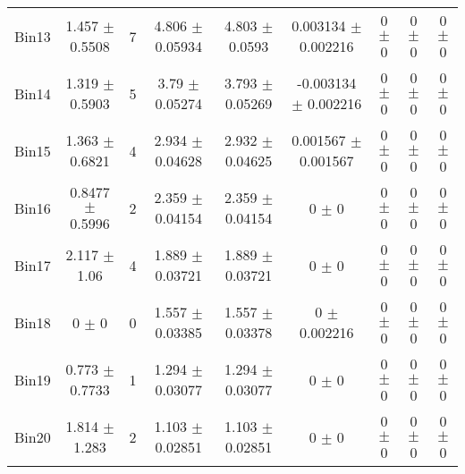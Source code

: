 \begin{tabular}{@{\extracolsep{4pt}}lcccccccc@{}}
     Bin13 & 1.457 $\pm$ 0.5508 & 7 & 4.806 $\pm$ 0.05934 & 4.803 $\pm$ 0.0593 & 0.003134 $\pm$ 0.002216 & 0 $\pm$ 0 & 0 $\pm$ 0 & 0 $\pm$ 0 \\ 
     Bin14 & 1.319 $\pm$ 0.5903 & 5 & 3.79 $\pm$ 0.05274 & 3.793 $\pm$ 0.05269 & -0.003134 $\pm$ 0.002216 & 0 $\pm$ 0 & 0 $\pm$ 0 & 0 $\pm$ 0 \\ 
     Bin15 & 1.363 $\pm$ 0.6821 & 4 & 2.934 $\pm$ 0.04628 & 2.932 $\pm$ 0.04625 & 0.001567 $\pm$ 0.001567 & 0 $\pm$ 0 & 0 $\pm$ 0 & 0 $\pm$ 0 \\ 
     Bin16 & 0.8477 $\pm$ 0.5996 & 2 & 2.359 $\pm$ 0.04154 & 2.359 $\pm$ 0.04154 & 0 $\pm$ 0 & 0 $\pm$ 0 & 0 $\pm$ 0 & 0 $\pm$ 0 \\ 
     Bin17 & 2.117 $\pm$ 1.06 & 4 & 1.889 $\pm$ 0.03721 & 1.889 $\pm$ 0.03721 & 0 $\pm$ 0 & 0 $\pm$ 0 & 0 $\pm$ 0 & 0 $\pm$ 0 \\ 
     Bin18 & 0 $\pm$ 0 & 0 & 1.557 $\pm$ 0.03385 & 1.557 $\pm$ 0.03378 & 0 $\pm$ 0.002216 & 0 $\pm$ 0 & 0 $\pm$ 0 & 0 $\pm$ 0 \\ 
     Bin19 & 0.773 $\pm$ 0.7733 & 1 & 1.294 $\pm$ 0.03077 & 1.294 $\pm$ 0.03077 & 0 $\pm$ 0 & 0 $\pm$ 0 & 0 $\pm$ 0 & 0 $\pm$ 0 \\ 
     Bin20 & 1.814 $\pm$ 1.283 & 2 & 1.103 $\pm$ 0.02851 & 1.103 $\pm$ 0.02851 & 0 $\pm$ 0 & 0 $\pm$ 0 & 0 $\pm$ 0 & 0 $\pm$ 0 \\ 
\hline\hline
  \end{tabular}
